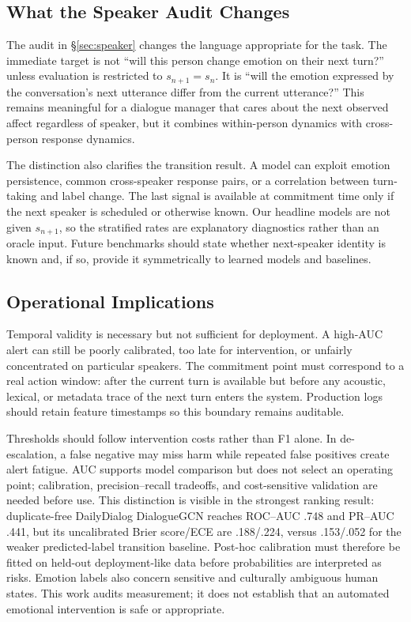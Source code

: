 \documentclass{ieeeaccess}
\begin{document}
\subsection{What the Speaker Audit Changes}

The audit in \S\ref{sec:speaker} changes the language appropriate for the task. The immediate
target is not ``will this person change emotion on their next turn?'' unless evaluation is
restricted to $s_{n+1}=s_n$. It is ``will the emotion expressed by the conversation's next
utterance differ from the current utterance?'' This remains meaningful for a dialogue manager that
cares about the next observed affect regardless of speaker, but it combines within-person dynamics
with cross-person response dynamics.

The distinction also clarifies the transition result. A model can exploit emotion persistence,
common cross-speaker response pairs, or a correlation between turn-taking and label change. The
last signal is available at commitment time only if the next speaker is scheduled or otherwise
known. Our headline models are not given $s_{n+1}$, so the stratified rates are explanatory
diagnostics rather than an oracle input. Future benchmarks should state whether next-speaker
identity is known and, if so, provide it symmetrically to learned models and baselines.

\subsection{Operational Implications}

Temporal validity is necessary but not sufficient for deployment. A high-AUC alert can still be
poorly calibrated, too late for intervention, or unfairly concentrated on particular speakers.
The commitment point must correspond to a real action window: after the current turn is available
but before any acoustic, lexical, or metadata trace of the next turn enters the system. Production
logs should retain feature timestamps so this boundary remains auditable.

Thresholds should follow intervention costs rather than F1 alone. In de-escalation, a false
negative may miss harm while repeated false positives create alert fatigue. AUC supports model
comparison but does not select an operating point; calibration, precision--recall tradeoffs, and
cost-sensitive validation are needed before use. This distinction is visible in the strongest
ranking result: duplicate-free DailyDialog DialogueGCN reaches ROC--AUC .748 and PR--AUC .441,
but its uncalibrated Brier score/ECE are .188/.224, versus .153/.052 for the weaker predicted-label
transition baseline. Post-hoc calibration must therefore be fitted on held-out deployment-like
data before probabilities are interpreted as risks. Emotion labels also concern sensitive and
culturally ambiguous human states. This work audits measurement; it does not establish that an
automated emotional intervention is safe or appropriate.
\end{document}
